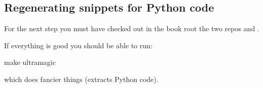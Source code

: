 \subsection{Regenerating snippets for Python code}


For the next step you must have checked out in the book root the two repos
 and .


If everything is good you should be able to run:
\begin{console}
    make ultramagic
\end{console}
which does fancier things (extracts Python code).
